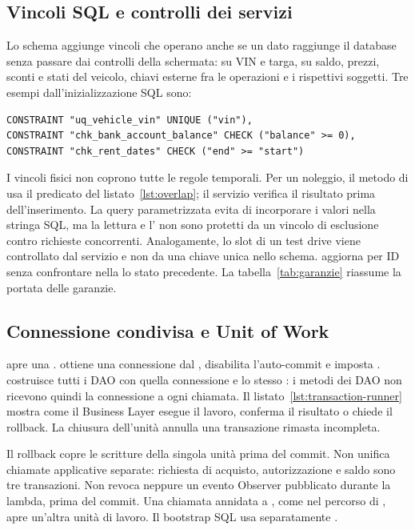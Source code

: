\subsection{Vincoli SQL e controlli dei servizi}\label{sec:concorrenza}
Lo schema aggiunge vincoli che operano anche se un dato raggiunge il database senza passare dai controlli della schermata:  su VIN e targa,  su saldo, prezzi, sconti e stati del veicolo, chiavi esterne fra le operazioni e i rispettivi soggetti. Tre esempi dall'inizializzazione SQL sono:

\begin{lstlisting}[caption={Vincoli fisici presenti in init.sql.},label={lst:vincoli-sql}]
CONSTRAINT "uq_vehicle_vin" UNIQUE ("vin"),
CONSTRAINT "chk_bank_account_balance" CHECK ("balance" >= 0),
CONSTRAINT "chk_rent_dates" CHECK ("end" >= "start")
\end{lstlisting}

I vincoli fisici non coprono tutte le regole temporali. Per un noleggio, il metodo  di  usa il predicato del listato~\ref{lst:overlap}; il servizio verifica il risultato prima dell'inserimento. La query parametrizzata evita di incorporare i valori nella stringa SQL, ma la lettura e l' non sono protetti da un vincolo di esclusione contro richieste concorrenti. Analogamente, lo slot di un test drive viene controllato dal servizio e non da una chiave unica nello schema.  aggiorna per ID senza confrontare nella  lo stato precedente. La tabella~\ref{tab:garanzie} riassume la portata delle garanzie.

\subsection{Connessione condivisa e Unit of Work}\label{sec:transazioni}
 apre una .  ottiene una connessione dal , disabilita l'auto-commit e imposta .  costruisce tutti i DAO con quella connessione e lo stesso : i metodi dei DAO non ricevono quindi la connessione a ogni chiamata. Il listato~\ref{lst:transaction-runner} mostra come il Business Layer esegue il lavoro, conferma il risultato o chiede il rollback. La chiusura dell'unità annulla una transazione rimasta incompleta.

Il rollback copre le scritture della singola unità prima del commit. Non unifica chiamate applicative separate: richiesta di acquisto, autorizzazione e saldo sono tre transazioni. Non revoca neppure un evento Observer pubblicato durante la lambda, prima del commit. Una chiamata annidata a , come nel percorso di , apre un'altra unità di lavoro. Il bootstrap SQL usa separatamente .

